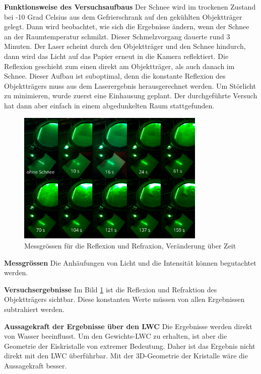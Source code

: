 \textbf{Funktionsweise des Versuchsaufbaus}
Der Schnee wird im trockenen Zustand bei -10 Grad Celsius aus dem Gefrierschrank auf den gekühlten Objektträger gelegt. Dann wird beobachtet, wie sich die Ergebnisse ändern, wenn der Schnee an der Raumtemperatur schmilzt. Dieser Schmelzvorgang dauerte rund 3 Minuten. Der Laser scheint durch den Objektträger und den Schnee hindurch, dann wird das Licht auf das Papier erneut in die Kamera reflektiert. Die Reflexion geschieht zum einen direkt am Objektträger, als auch danach im Schnee. Dieser Aufbau ist suboptimal, denn die konstante Reflexion des Objektträgers muss aus dem Laserergebnis herausgerechnet werden. Um Störlicht zu minimieren, wurde zuerst eine Einhausung geplant. Der durchgeführte Versuch hat dann aber einfach in einem abgedunkelten Raum stattgefunden.


\begin{figure}[h]
    \centering
    \includegraphics[width=0.8\textwidth]{Bilder/Screenshotfrom2024-04-0413-27-28.png}
    \caption{Messgrössen für die Reflexion und Refraxion, Veränderung über Zeit}
    \label{fig:LaserRef}
\end{figure}



\textbf{Messgrössen}
Die Anhäufungen von Licht und die Intensität können begutachtet werden.

\textbf{Versuchsergebnisse}
Im Bild \ref{fig:LaserRef} ist die Reflexion und Refraktion des Objektträgers sichtbar. Diese konstanten Werte müssen von allen Ergebnissen subtrahiert werden.








\textbf{Aussagekraft der Ergebnisse über den LWC}
Die Ergebnisse werden direkt von Wasser beeinflusst. Um den Gewichts-LWC zu erhalten, ist aber die Geometrie der Eiskristalle von extremer Bedeutung. Daher ist das Ergebnis nicht direkt mit den LWC überführbar. Mit der 3D-Geometrie der Kristalle wäre die Aussagekraft besser.

